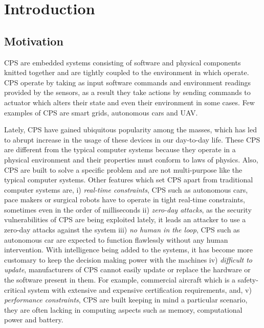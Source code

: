 
\chapter{Introduction}
\label{ch:Introduction}

\section{Motivation}
\label{sec:Motivation}

\ac{CPS} are embedded systems consisting of software and physical components knitted together and are tightly coupled to the environment in which operate. \ac{CPS} operate by taking as input software commands and environment readings provided by the sensors, as a result they take actions by sending commands to actuator which alters their state and even their environment in some cases. Few examples of \ac{CPS} are smart grids\cite{karnouskos2011cyber, ericsson2010cyber}, autonomous cars\cite{checkoway2011comprehensive, yang2014vehicle} and \ac{UAV}\cite{javaid2012cyber, mohammed2014uavs}.

Lately, CPS have gained ubiquitous popularity among the masses, which has led to abrupt increase in the usage of these devices in our day-to-day life. These \ac{CPS} are different from the typical computer systems because they operate in a physical environment and their properties must conform to laws of physics. Also, \ac{CPS} are built to solve a specific problem and are not multi-purpose like the typical computer systems. Other features which set \ac{CPS} apart from traditional computer systems are, i) \textit{real-time constraints}, \ac{CPS} such as autonomous cars, pace makers or surgical robots have to operate in tight real-time constraints, sometimes even in the order of milliseconds ii) \textit{zero-day attacks}, as the security vulnerabilities of \ac{CPS} are being exploited lately, it leads an attacker to use a zero-day attacks against the system iii) \textit{no human in the loop}, \ac{CPS} such as autonomous car are expected to function flawlessly without any human intervention. With intelligence being added to the systems, it has become more customary to keep the decision making power with the machines  iv) \textit{difficult to update}, manufacturers of \ac{CPS} cannot easily update or replace the hardware or the software present in them. For example, commercial aircraft which is a safety-critical system with extensive and expensive certification requirements, and, v) \textit{performance constraints}, \ac{CPS} are built keeping in mind a particular scenario, they are often lacking in computing aspects such as memory, computational power and battery.

